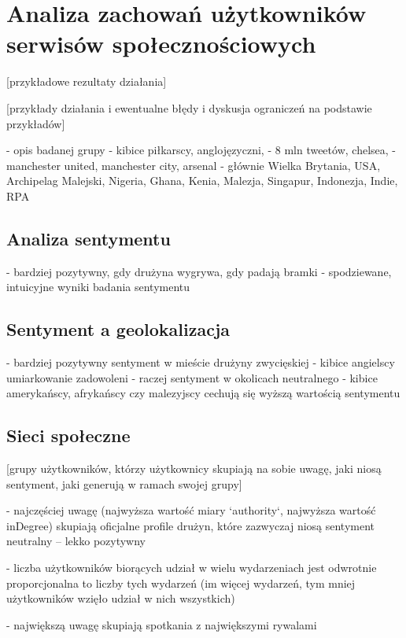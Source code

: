 \chapter{Analiza zachowań użytkowników serwisów społecznościowych}

\begin{comment}

\end{comment}
[przykładowe rezultaty działania]

[przykłady działania i ewentualne błędy i dyskusja ograniczeń na podstawie
przykładów]

- opis badanej grupy 
- kibice piłkarscy, anglojęzyczni, 
- 8 mln tweetów, chelsea,
- manchester united, manchester city, arsenal
- głównie Wielka Brytania, USA, Archipelag Malejski, Nigeria, Ghana, Kenia,
Malezja, Singapur, Indonezja, Indie, RPA

\section{Analiza sentymentu}
- bardziej pozytywny, gdy drużyna wygrywa, gdy padają bramki
- spodziewane, intuicyjne wyniki badania sentymentu
\section{Sentyment a geolokalizacja}
- bardziej pozytywny sentyment w mieście drużyny zwycięskiej
- kibice angielscy umiarkowanie zadowoleni
- raczej sentyment w okolicach neutralnego
- kibice amerykańscy, afrykańscy czy malezyjscy cechują się wyższą wartością
sentymentu
\section{Sieci społeczne}
[grupy użytkowników, którzy użytkownicy skupiają na sobie uwagę, jaki niosą sentyment,
jaki generują w ramach swojej grupy]

- najczęściej uwagę (najwyższa wartość miary `authority`, najwyższa wartość
inDegree) skupiają 
oficjalne profile drużyn, które zazwyczaj niosą sentyment neutralny 
-- lekko pozytywny 

- liczba użytkowników biorących udział w wielu wydarzeniach jest
odwrotnie proporcjonalna to liczby tych wydarzeń (im więcej wydarzeń, tym
mniej użytkowników wzięło udział w nich wszystkich)

- największą uwagę skupiają spotkania z największymi rywalami